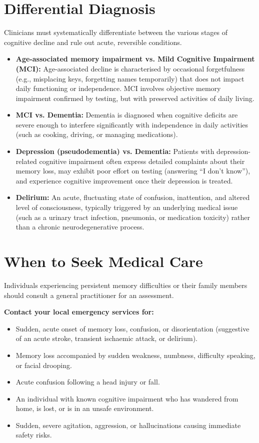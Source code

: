 \section*{Differential Diagnosis}
Clinicians must systematically differentiate between the various stages of cognitive decline and rule out acute, reversible conditions.
\begin{itemize}
    \item \textbf{Age-associated memory impairment vs. Mild Cognitive Impairment (MCI):} Age-associated decline is characterised by occasional forgetfulness (e.g., misplacing keys, forgetting names temporarily) that does not impact daily functioning or independence. MCI involves objective memory impairment confirmed by testing, but with preserved activities of daily living.
    \item \textbf{MCI vs. Dementia:} Dementia is diagnosed when cognitive deficits are severe enough to interfere significantly with independence in daily activities (such as cooking, driving, or managing medications).
    \item \textbf{Depression (pseudodementia) vs. Dementia:} Patients with depression-related cognitive impairment often express detailed complaints about their memory loss, may exhibit poor effort on testing (answering ``I don't know''), and experience cognitive improvement once their depression is treated.
    \item \textbf{Delirium:} An acute, fluctuating state of confusion, inattention, and altered level of consciousness, typically triggered by an underlying medical issue (such as a urinary tract infection, pneumonia, or medication toxicity) rather than a chronic neurodegenerative process.
\end{itemize}

\section*{When to Seek Medical Care}
Individuals experiencing persistent memory difficulties or their family members should consult a general practitioner for an assessment.

\textbf{Contact your local emergency services for:}
\begin{itemize}
    \item Sudden, acute onset of memory loss, confusion, or disorientation (suggestive of an acute stroke, transient ischaemic attack, or delirium).
    \item Memory loss accompanied by sudden weakness, numbness, difficulty speaking, or facial drooping.
    \item Acute confusion following a head injury or fall.
    \item An individual with known cognitive impairment who has wandered from home, is lost, or is in an unsafe environment.
    \item Sudden, severe agitation, aggression, or hallucinations causing immediate safety risks.
\end{itemize}

